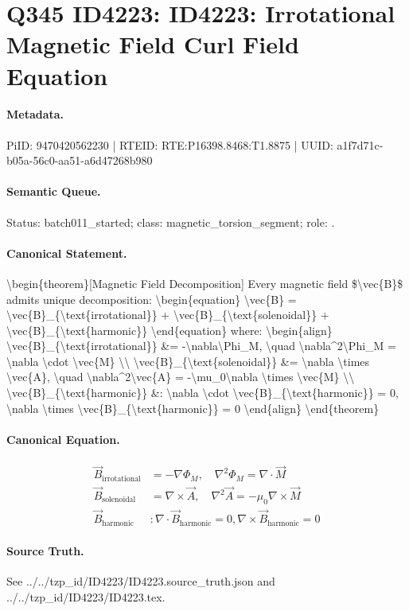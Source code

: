 \section*{Q345 ID4223: ID4223: Irrotational Magnetic Field Curl Field Equation}
\paragraph{Metadata.}
PiID: 9470420562230 | RTEID: RTE:P16398.8468:T1.8875 | UUID: a1f7d71c-b05a-56c0-aa51-a6d47268b980

\paragraph{Semantic Queue.}
Status: batch011\_started; class: magnetic\_torsion\_segment; role: .

\paragraph{Canonical Statement.}
\textbackslash{}begin\{theorem\}[Magnetic Field Decomposition] Every magnetic field \$\textbackslash{}vec\{B\}\$ admits unique decomposition: \textbackslash{}begin\{equation\} \textbackslash{}vec\{B\} = \textbackslash{}vec\{B\}\_\{\textbackslash{}text\{irrotational\}\} + \textbackslash{}vec\{B\}\_\{\textbackslash{}text\{solenoidal\}\} + \textbackslash{}vec\{B\}\_\{\textbackslash{}text\{harmonic\}\} \textbackslash{}end\{equation\} where: \textbackslash{}begin\{align\} \textbackslash{}vec\{B\}\_\{\textbackslash{}text\{irrotational\}\} \&= -\textbackslash{}nabla\textbackslash{}Phi\_M, \textbackslash{}quad \textbackslash{}nabla\textasciicircum{}2\textbackslash{}Phi\_M = \textbackslash{}nabla \textbackslash{}cdot \textbackslash{}vec\{M\} \textbackslash{}\textbackslash{} \textbackslash{}vec\{B\}\_\{\textbackslash{}text\{solenoidal\}\} \&= \textbackslash{}nabla \textbackslash{}times \textbackslash{}vec\{A\}, \textbackslash{}quad \textbackslash{}nabla\textasciicircum{}2\textbackslash{}vec\{A\} = -\textbackslash{}mu\_0\textbackslash{}nabla \textbackslash{}times \textbackslash{}vec\{M\} \textbackslash{}\textbackslash{} \textbackslash{}vec\{B\}\_\{\textbackslash{}text\{harmonic\}\} \&: \textbackslash{}nabla \textbackslash{}cdot \textbackslash{}vec\{B\}\_\{\textbackslash{}text\{harmonic\}\} = 0, \textbackslash{}nabla \textbackslash{}times \textbackslash{}vec\{B\}\_\{\textbackslash{}text\{harmonic\}\} = 0 \textbackslash{}end\{align\} \textbackslash{}end\{theorem\}

\paragraph{Canonical Equation.}
\[
\begin{align} \vec{B}_{\text{irrotational}} &= -\nabla\Phi_M, \quad \nabla^2\Phi_M = \nabla \cdot \vec{M} \\ \vec{B}_{\text{solenoidal}} &= \nabla \times \vec{A}, \quad \nabla^2\vec{A} = -\mu_0\nabla \times \vec{M} \\ \vec{B}_{\text{harmonic}} &: \nabla \cdot \vec{B}_{\text{harmonic}} = 0, \nabla \times \vec{B}_{\text{harmonic}} = 0 \end{align}
\]

\paragraph{Source Truth.}
See ../../tzp\_id/ID4223/ID4223.source\_truth.json and ../../tzp\_id/ID4223/ID4223.tex.
